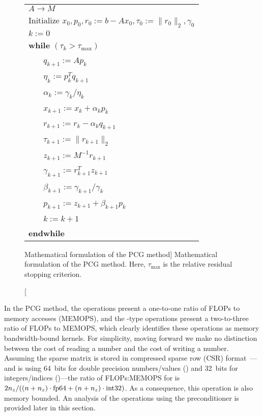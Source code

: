\begin{figure}[t]
{\small
\begin{center}
\begin{tabular}{|l|}
\hline
  $A \rightarrow M$  
\\Initialize $x_0, p_0, r_0 := b-Ax_0, \tau_0 := \parallel r_{0}\parallel_2, 
\gamma_0$
\\ $k := 0$                                                
\\ {\bf while} $(\tau_{k} > \tau_{\max})$   
\\ ~~~ $q_{k+1}:=Ap_{k}$                        
\\ ~~~ $\eta_k:=p_{k}^Tq_{k+1}$    
\\ ~~~ $\alpha_k:=\gamma_k/\eta_k$    
\\ ~~~ $x_{k+1}:=x_k+\alpha_k p_{k}$           
\\ ~~~ $r_{k+1}:=r_k-\alpha_k q_{k+1}$            
\\ ~~~ $\tau_{k+1}:=\parallel r_{k+1}\parallel_2 $  
\\ ~~~ $z_{k+1}:=M^{-1} r_{k+1}$            
\\ ~~~ $\gamma_{k+1}:= r_{k+1}^T z_{k+1}$    
\\ ~~~ $\beta_{k+1}:=\gamma_{k+1}/\gamma_{k}$  
\\ ~~~ $p_{k+1}:= z_{k+1} + \beta_{k+1} p_k$ 

\\ ~~~ $k:=k+1$   
\\ {\bf endwhile}  
\\\hline
\end{tabular}
\end{center}
}
\caption
[Mathematical formulation of the PCG method]
{Mathematical formulation of the PCG method. Here, $\tau_{\max}$ is
the relative residual stopping criterion.}
\label{2017-adaptive-block-jacobi:fig:pcg}
\end{figure}

In the PCG method, the \dotp operations present a
one-to-one ratio
of FLOPs to memory accesses (MEMOPS), and the \axpy-type operations present a 
two-to-three ratio of FLOPs to MEMOPS, which clearly identifies these 
operations as 
memory bandwidth-bound kernels. For simplicity, moving forward we make no 
distinction between 
the cost of reading a number and the cost of writing a number. Assuming the 
sparse 
matrix is stored in compressed sparse row (CSR) format~\cite{saad}---and is 
using 64~bits for double precision numbers/values (\fpd) and 32~bits for 
integers/indices (\inti)---the 
ratio of FLOPs:MEMOPS for \spmv is $2n_z/((n+n_z) \cdot \mbox{\rm fp64} + (n+n_z) \cdot
\mbox{\rm int32})$. As a consequence,
this operation is also memory bounded.
An analysis of the operations using the preconditioner is provided later
in this section.

